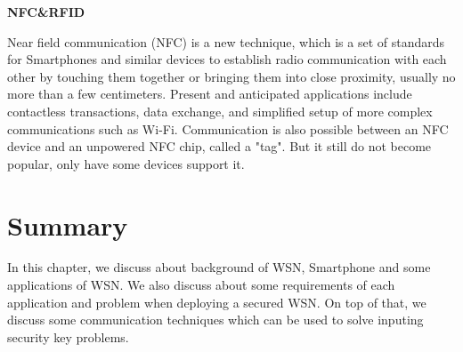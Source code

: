 
{\bf NFC\&RFID\cite{nfc}}

Near field communication (NFC) is a new technique, which is a set of standards for Smartphones and similar devices to establish radio communication with each other by touching them together or bringing them into close proximity, usually no more than a few centimeters. Present and anticipated applications include contactless transactions, data exchange, and simplified setup of more complex communications such as Wi-Fi. Communication is also possible between an NFC device and an unpowered NFC chip, called a "tag". But it still do not become popular, only have some devices support it.


\section{Summary}\label{sec:bg_sm}

In this chapter, we discuss about background of WSN, Smartphone and some applications of WSN. We also discuss about some requirements of each application and problem when deploying a secured WSN. On top of that, we discuss some communication techniques which can be used to solve inputing security key problems.